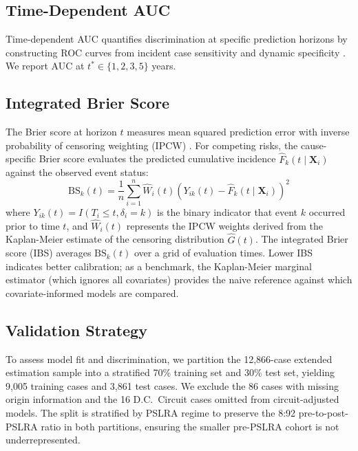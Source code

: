 \subsection{Time-Dependent AUC}

Time-dependent AUC quantifies discrimination at specific
prediction horizons by constructing ROC curves from incident
case sensitivity and dynamic specificity \citep{heagerty2000}.
We report AUC at $t^* \in \{1, 2, 3, 5\}$ years.

\subsection{Integrated Brier Score}

The Brier score at horizon $t$ measures mean squared prediction
error with inverse probability of censoring weighting (IPCW)
\citep{graf1999}. For competing risks, the cause-specific Brier 
score evaluates the predicted cumulative incidence $\hat{F}_k(t \mid \mathbf{X}_i)$ 
against the observed event status:
\begin{equation}
\text{BS}_k(t) = \frac{1}{n} \sum_{i=1}^n \widehat{W}_i(t) \left( Y_{ik}(t) - \hat{F}_k(t \mid \mathbf{X}_i) \right)^2
\end{equation}
where $Y_{ik}(t) = I(T_i \leq t, \delta_i = k)$ is the binary indicator that event $k$ occurred prior to time $t$, and $\widehat{W}_i(t)$ represents the IPCW weights derived from the Kaplan-Meier estimate of the censoring distribution $\hat{G}(t)$. The integrated Brier score (IBS) averages $\text{BS}_k(t)$
over a grid of evaluation times. Lower IBS indicates better
calibration; as a benchmark, the Kaplan-Meier marginal
estimator (which ignores all covariates) provides the naive
reference against which covariate-informed models are
compared.

\subsection{Validation Strategy}

To assess model fit and discrimination, we partition the
12,866-case extended estimation sample into a stratified
70\% training set and 30\% test set, yielding 9,005 training
cases and 3,861 test cases. We exclude the 86 cases with
missing origin information and the 16 D.C.\ Circuit cases
omitted from circuit-adjusted models. The split is stratified
by PSLRA regime to preserve the 8:92 pre-to-post-PSLRA ratio
in both partitions, ensuring the smaller pre-PSLRA cohort is
not underrepresented.

